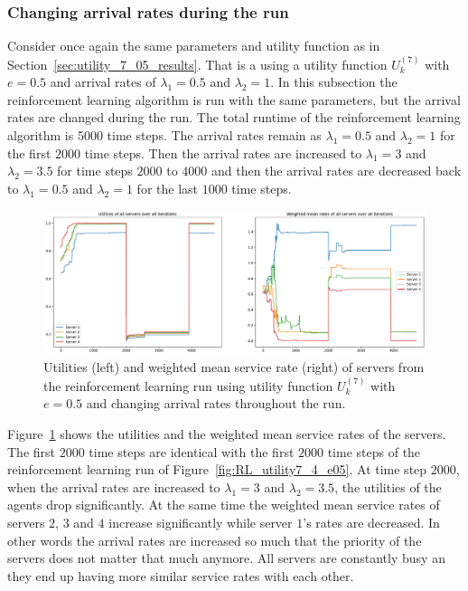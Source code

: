 \subsubsection{Changing arrival rates during the run}
\label{subsubsec:reinforcement_learning_special_case}

Consider once again the same parameters and utility function as in
Section~\ref{sec:utility_7_05_results}.
That is a using a utility function \(U_k^{(7)}\) with \(e = 0.5\) and arrival
rates of \(\lambda_1 = 0.5\) and \(\lambda_2 = 1\).
In this subsection the reinforcement learning algorithm is run with the same
parameters, but the arrival rates are changed during the run.
The total runtime of the reinforcement learning algorithm is 5000 time steps.
The arrival rates remain as \(\lambda_1 = 0.5\) and \(\lambda_2 = 1\) for the
first \(2000\) time steps.
Then the arrival rates are increased to \(\lambda_1 = 3\) and
\(\lambda_2 = 3.5\) for time steps \(2000\) to \(4000\) and then the arrival
rates are decreased back to \(\lambda_1 = 0.5\) and \(\lambda_2 = 1\) for the
last \(1000\) time steps.

\begin{figure}[H]
    \includegraphics[width=\textwidth]{chapters/06_agent_based_extension/Bin/reinforcement_learning_results/utility_7/u7_6_final.pdf}
    \caption{Utilities (left) and weighted mean service rate (right) of servers
    from the reinforcement learning run using utility function \(U_k^{(7)}\)
    with \(e = 0.5\) and changing arrival rates throughout the run.}
    \label{fig:RL_utility7_6_final}
\end{figure}

Figure~\ref{fig:RL_utility7_6_final} shows the utilities and the weighted mean
service rates of the servers.
The first \(2000\) time steps are identical with the first \(2000\) time steps
of the reinforcement learning run of Figure~\ref{fig:RL_utility7_4_e05}.
At time step \(2000\), when the arrival rates are increased to \(\lambda_1 = 3\)
and \(\lambda_2 = 3.5\), the utilities of the agents drop significantly.
At the same time the weighted mean service rates of servers \(2\), \(3\) and
\(4\) increase significantly while server \(1\)'s rates are decreased.
In other words the arrival rates are increased so much that the priority of
the servers does not matter that much anymore.
All servers are constantly busy an they end up having more similar service
rates with each other.

